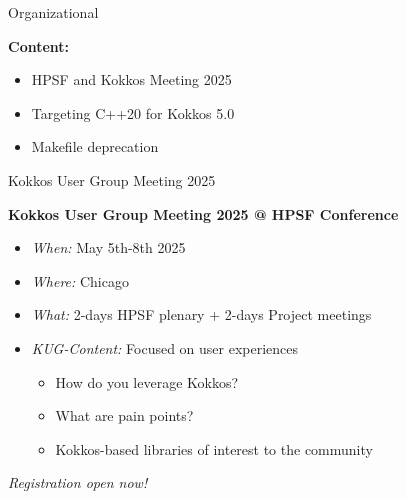 

\begin{frame}[fragile]

  {\Huge Organizational}

  \vspace{10pt}

  \textbf{Content:}
  \begin{itemize}
    \item HPSF and Kokkos Meeting 2025
    \item Targeting C++20 for Kokkos 5.0
    \item Makefile deprecation
  \end{itemize}

\end{frame}


\begin{frame}[fragile]{Kokkos User Group Meeting 2025}
\begin{center}
\textbf{Kokkos User Group Meeting 2025 @ HPSF Conference}
\end{center}

\begin{itemize}
\item{\textit{When:} May 5th-8th 2025}
\item{\textit{Where:} Chicago}
\item{\textit{What:} 2-days HPSF plenary + 2-days Project meetings}
\item{\textit{KUG-Content:} Focused on user experiences
\begin{itemize}
   \item{How do you leverage Kokkos?}
   \item{What are pain points?}
   \item{Kokkos-based libraries of interest to the community}
\end{itemize}
}
\end{itemize}


\vspace{10pt}

\begin{center}
\textit{Registration open now!}
\end{center}
\end{frame}


